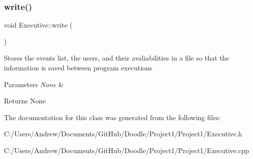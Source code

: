 \subsubsection{\texorpdfstring{write()}{write()}}
{\footnotesize\ttfamily void Executive\+::write (\begin{DoxyParamCaption}{ }\end{DoxyParamCaption})}

Stores the events list, the users, and their avaliabilities in a file so that the information is saved between program executions 
\begin{DoxyParams}{Parameters}
{\em None} & \\
\hline
\end{DoxyParams}
\begin{DoxyReturn}{Returns}
None 
\end{DoxyReturn}


The documentation for this class was generated from the following files\+:\begin{DoxyCompactItemize}
\item 
C\+:/\+Users/\+Andrew/\+Documents/\+Git\+Hub/\+Doodle/\+Project1/\+Project1/Executive.\+h\item 
C\+:/\+Users/\+Andrew/\+Documents/\+Git\+Hub/\+Doodle/\+Project1/\+Project1/Executive.\+cpp\end{DoxyCompactItemize}
